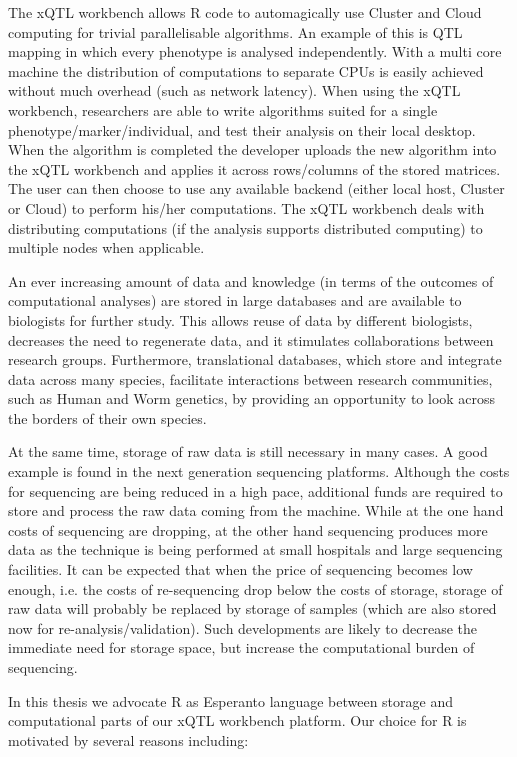 The xQTL workbench allows R code to automagically use Cluster and Cloud computing for trivial parallelisable algorithms. An example of this is QTL mapping 
in which every phenotype is analysed independently. With a multi core machine the distribution of computations to separate CPUs is easily achieved without 
much overhead (such as network latency). When using the xQTL workbench, researchers are able to write algorithms suited for a single 
phenotype/marker/individual, and test their analysis on their local desktop. When the algorithm is completed the developer uploads the new algorithm into 
the xQTL workbench and applies it across rows/columns of the stored matrices. The user can then choose to use any available backend (either local host, 
Cluster or Cloud) to perform his/her computations. The xQTL workbench deals with distributing computations (if the analysis supports distributed computing) 
to multiple nodes when applicable. 

An ever increasing amount of data and knowledge (in terms of the outcomes of computational analyses) are stored in large databases and are available to 
biologists for further study. This allows reuse of data by different biologists, decreases the need to regenerate data, and it stimulates collaborations 
between research groups. Furthermore, translational databases, which store and integrate data across many species, facilitate interactions between 
research communities, such as Human and Worm genetics, by providing an opportunity to look across the borders of their own species. 

At the same time, storage of raw data is still necessary in many cases. A good example is found in the next generation sequencing platforms. Although the 
costs for sequencing are being reduced in a high pace, additional funds are required to store and process the raw data coming from the machine. While at 
the one hand costs of sequencing are dropping, at the other hand sequencing produces more data as the technique is being performed at small hospitals and 
large sequencing facilities. It can be expected that when the price of sequencing becomes low enough, i.e. the costs of re-sequencing drop below the 
costs of storage, storage of raw data will probably be replaced by storage of samples (which are also stored now for re-analysis/validation). Such 
developments are likely to decrease the immediate need for storage space, but increase the computational burden of sequencing.

In this thesis we advocate R \cite{R:2005} as Esperanto language between storage and computational parts of our xQTL workbench platform. Our choice for 
R is motivated by several reasons including: 

